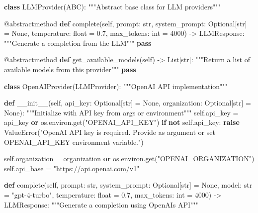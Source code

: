 \documentclass[
  11pt,
  letterpaper,
]{book}
\newenvironment{Shaded}{\begin{snugshade}}{\end{snugshade}}
\newcommand{\AttributeTok}[1]{\textcolor[rgb]{0.40,0.45,0.13}{#1}}
\newcommand{\BuiltInTok}[1]{\textcolor[rgb]{0.00,0.23,0.31}{#1}}
\newcommand{\CommentTok}[1]{\textcolor[rgb]{0.37,0.37,0.37}{#1}}
\newcommand{\ControlFlowTok}[1]{\textcolor[rgb]{0.00,0.23,0.31}{\textbf{#1}}}
\newcommand{\DecValTok}[1]{\textcolor[rgb]{0.68,0.00,0.00}{#1}}
\newcommand{\FloatTok}[1]{\textcolor[rgb]{0.68,0.00,0.00}{#1}}
\newcommand{\FunctionTok}[1]{\textcolor[rgb]{0.28,0.35,0.67}{#1}}
\newcommand{\KeywordTok}[1]{\textcolor[rgb]{0.00,0.23,0.31}{\textbf{#1}}}
\newcommand{\NormalTok}[1]{\textcolor[rgb]{0.00,0.23,0.31}{#1}}
\newcommand{\OperatorTok}[1]{\textcolor[rgb]{0.37,0.37,0.37}{#1}}
\newcommand{\PreprocessorTok}[1]{\textcolor[rgb]{0.68,0.00,0.00}{#1}}
\newcommand{\StringTok}[1]{\textcolor[rgb]{0.13,0.47,0.30}{#1}}
\newcommand{\VariableTok}[1]{\textcolor[rgb]{0.07,0.07,0.07}{#1}}
\begin{document}
\begin{Shaded}
\begin{Highlighting}[]
\KeywordTok{class}\NormalTok{ LLMProvider(ABC):}
    \CommentTok{"""Abstract base class for LLM providers"""}

    \AttributeTok{@abstractmethod}
    \KeywordTok{def}\NormalTok{ complete(}\VariableTok{self}\NormalTok{,}
\NormalTok{                prompt: }\BuiltInTok{str}\NormalTok{,}
\NormalTok{                system\_prompt: Optional[}\BuiltInTok{str}\NormalTok{] }\OperatorTok{=} \VariableTok{None}\NormalTok{,}
\NormalTok{                temperature: }\BuiltInTok{float} \OperatorTok{=} \FloatTok{0.7}\NormalTok{,}
\NormalTok{                max\_tokens: }\BuiltInTok{int} \OperatorTok{=} \DecValTok{4000}\NormalTok{) }\OperatorTok{{-}\textgreater{}}\NormalTok{ LLMResponse:}
        \CommentTok{"""Generate a completion from the LLM"""}
        \ControlFlowTok{pass}

    \AttributeTok{@abstractmethod}
    \KeywordTok{def}\NormalTok{ get\_available\_models(}\VariableTok{self}\NormalTok{) }\OperatorTok{{-}\textgreater{}}\NormalTok{ List[}\BuiltInTok{str}\NormalTok{]:}
        \CommentTok{"""Return a list of available models from this provider"""}
        \ControlFlowTok{pass}

\KeywordTok{class}\NormalTok{ OpenAIProvider(LLMProvider):}
    \CommentTok{"""OpenAI API implementation"""}

    \KeywordTok{def} \FunctionTok{\_\_init\_\_}\NormalTok{(}\VariableTok{self}\NormalTok{, api\_key: Optional[}\BuiltInTok{str}\NormalTok{] }\OperatorTok{=} \VariableTok{None}\NormalTok{, organization: Optional[}\BuiltInTok{str}\NormalTok{] }\OperatorTok{=} \VariableTok{None}\NormalTok{):}
        \CommentTok{"""Initialize with API key from args or environment"""}
        \VariableTok{self}\NormalTok{.api\_key }\OperatorTok{=}\NormalTok{ api\_key }\KeywordTok{or}\NormalTok{ os.environ.get(}\StringTok{"OPENAI\_API\_KEY"}\NormalTok{)}
        \ControlFlowTok{if} \KeywordTok{not} \VariableTok{self}\NormalTok{.api\_key:}
            \ControlFlowTok{raise} \PreprocessorTok{ValueError}\NormalTok{(}\StringTok{"OpenAI API key is required. Provide as argument or set OPENAI\_API\_KEY environment variable."}\NormalTok{)}

        \VariableTok{self}\NormalTok{.organization }\OperatorTok{=}\NormalTok{ organization }\KeywordTok{or}\NormalTok{ os.environ.get(}\StringTok{"OPENAI\_ORGANIZATION"}\NormalTok{)}
        \VariableTok{self}\NormalTok{.api\_base }\OperatorTok{=} \StringTok{"https://api.openai.com/v1"}

    \KeywordTok{def}\NormalTok{ complete(}\VariableTok{self}\NormalTok{,}
\NormalTok{                prompt: }\BuiltInTok{str}\NormalTok{,}
\NormalTok{                system\_prompt: Optional[}\BuiltInTok{str}\NormalTok{] }\OperatorTok{=} \VariableTok{None}\NormalTok{,}
\NormalTok{                model: }\BuiltInTok{str} \OperatorTok{=} \StringTok{"gpt{-}4{-}turbo"}\NormalTok{,}
\NormalTok{                temperature: }\BuiltInTok{float} \OperatorTok{=} \FloatTok{0.7}\NormalTok{,}
\NormalTok{                max\_tokens: }\BuiltInTok{int} \OperatorTok{=} \DecValTok{4000}\NormalTok{) }\OperatorTok{{-}\textgreater{}}\NormalTok{ LLMResponse:}
        \CommentTok{"""Generate a completion using OpenAI\textquotesingle{}s API"""}


\end{Highlighting}
\end{Shaded}
\end{document}
